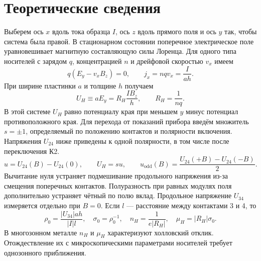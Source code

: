\documentclass[a4paper,12pt]{article}
\begin{document}
\section{Теоретические сведения}
Выберем ось $x$ вдоль тока образца $I$, ось $z$ вдоль прямого поля и ось $y$ так, чтобы система была правой. В стационарном состоянии поперечное электрическое поле уравновешивает магнитную составляющую силы Лоренца. Для одного типа носителей с зарядом $q$, концентрацией $n$ и дрейфовой скоростью $v_x$ имеем
\[
 q(E_y-v_xB_z)=0,\qquad j_x=nqv_x=\frac{I}{ah}.
\]
При ширине пластинки $a$ и толщине $h$ получаем
\begin{equation}
 U_H\equiv aE_y=R_H\frac{IB_z}{h},\qquad R_H=\frac{1}{nq}.
 \label{eq:hall}
\end{equation}
В этой системе $U_H$ равно потенциалу края при меньшем $y$ минус потенциал противоположного края. Для перехода от показаний прибора введём множитель $s=\pm1$, определяемый по положению контактов и полярности включения. Напряжения $U_{24}$ ниже приведены к одной полярности, в том числе после переключения К2.
\begin{equation}
 u=U_{24}(B)-U_{24}(0),\qquad U_H=s u,\qquad
 u_{\mathrm{odd}}(B)=\frac{U_{24}(+B)-U_{24}(-B)}{2}.
 \label{eq:odd}
\end{equation}
Вычитание нуля устраняет подмешивание продольного напряжения из-за смещения поперечных контактов. Полуразность при равных модулях поля дополнительно устраняет чётный по полю вклад. Продольное напряжение $U_{34}$ измеряется отдельно при $B=0$. Если $l$ --- расстояние между контактами 3 и 4, то
\begin{equation}
 \rho_0=\frac{|U_{34}|ah}{|I|l},\quad \sigma_0=\rho_0^{-1},\quad
 n_H=\frac{1}{e|R_H|},\quad \mu_H=|R_H|\sigma_0.
 \label{eq:transport}
\end{equation}
В многозонном металле $n_H$ и $\mu_H$ характеризуют холловский отклик. Отождествление их с микроскопическими параметрами носителей требует однозонного приближения.
\end{document}
